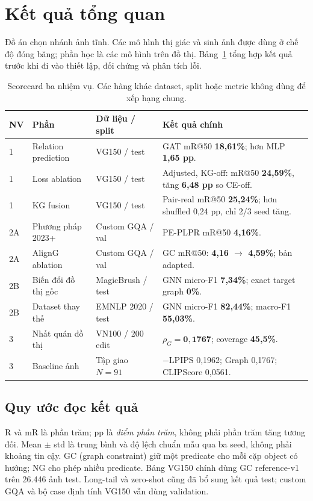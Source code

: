\section{Kết quả tổng quan}
Đồ án chọn nhánh ảnh tĩnh. Các mô hình thị giác và sinh ảnh được dùng ở chế độ
đóng băng; phần học là các mô hình trên đồ thị. Bảng~\ref{tab:scorecard} tổng hợp
kết quả trước khi đi vào thiết lập, đối chứng và phân tích lỗi.

\begin{table}[H]\centering\small
\caption{Scorecard ba nhiệm vụ. Các hàng khác dataset, split hoặc metric không dùng để xếp hạng chung.}\label{tab:scorecard}
\begin{tabularx}{\linewidth}{@{}p{10mm}p{28mm}p{29mm}X@{}}
\toprule NV & Phần & Dữ liệu / split & Kết quả chính\\\midrule
1 & Relation prediction & VG150 / test & GAT mR@50 \textbf{18,61\%}; hơn MLP \textbf{1,65 pp}.\\
1 & Loss ablation & VG150 / test & Adjusted, KG-off: mR@50 \textbf{24,59\%}, tăng \textbf{6,48 pp} so CE-off.\\
1 & KG fusion & VG150 / test & Pair-real mR@50 \textbf{25,24\%}; hơn shuffled 0,24 pp, chỉ 2/3 seed tăng.\\
2A & Phương pháp 2023+ & Custom GQA / val & PE-PLPR mR@50 \textbf{4,16\%}.\\
2A & AlignG ablation & Custom GQA / val & GC mR@50: \textbf{4,16 $\to$ 4,59\%}; bản adapted.\\
2B & Biến đổi đồ thị gốc & MagicBrush / test & GNN micro-F1 \textbf{7,34\%}; exact target graph \textbf{0\%}.\\
2B & Dataset thay thế & EMNLP 2020 / test & GNN micro-F1 \textbf{82,44\%}; macro-F1 \textbf{55,03\%}.\\
3 & Nhất quán đồ thị & VN100 / 200 edit & $\rho_G=\mathbf{0,1767}$; coverage \textbf{45,5\%}.\\
3 & Baseline ảnh & Tập giao $N=91$ & $-\mathrm{LPIPS}$ 0,1962; Graph 0,1767; CLIPScore 0,0561.\\
\bottomrule\end{tabularx}
\end{table}

\subsection{Quy ước đọc kết quả}
R và mR là phần trăm; pp là \emph{điểm phần trăm}, không phải phần trăm tăng
tương đối. Mean $\pm$ std là trung bình và độ lệch chuẩn mẫu qua ba seed,
không phải khoảng tin cậy. GC (graph constraint) giữ một predicate cho mỗi cặp
object có hướng; NG cho phép nhiều predicate. Bảng VG150 chính dùng GC
reference-v1 trên 26.446 ảnh test. Long-tail và zero-shot cũng đã bổ sung
kết quả test; custom GQA và bộ case định tính VG150 vẫn dùng validation.


